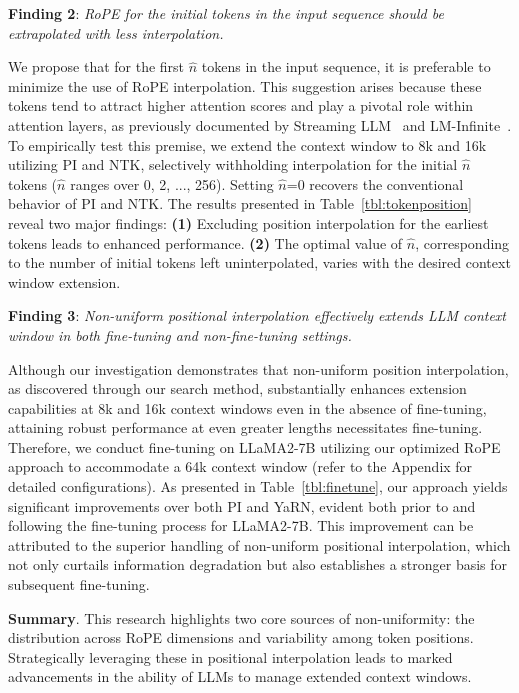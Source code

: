 \textbf{Finding 2}: \textit{RoPE for the initial tokens in the input sequence should be extrapolated with less interpolation.} 

We propose that for the first $\hat{n}$ tokens in the input sequence, it is preferable to minimize the use of RoPE interpolation. This suggestion arises because these tokens tend to attract higher attention scores and play a pivotal role within attention layers, as previously documented by Streaming LLM~\cite{streamingllm} and LM-Infinite~\cite{han2023lminfinite}. To empirically test this premise, we extend the context window to 8k and 16k utilizing PI and NTK, selectively withholding interpolation for the initial $\hat{n}$ tokens ($\hat n$ ranges over 0, 2, ..., 256). Setting $\hat{n}$=0 recovers the conventional behavior of PI and NTK. The results presented in Table~\ref{tbl:tokenposition} reveal two major findings: \textbf{(1)} Excluding position interpolation for the earliest tokens leads to enhanced performance. \textbf{(2)} The optimal value of $\hat{n}$, corresponding to the number of initial tokens left uninterpolated, varies with the desired context window extension.

\textbf{Finding 3}: \textit{Non-uniform positional interpolation effectively extends LLM context window in both fine-tuning and non-fine-tuning settings.} 

Although our investigation demonstrates that non-uniform position interpolation, as discovered through our search method, substantially enhances extension capabilities at 8k and 16k context windows even in the absence of fine-tuning, attaining robust performance at even greater lengths necessitates fine-tuning. Therefore, we conduct fine-tuning on LLaMA2-7B utilizing our optimized RoPE approach to accommodate a 64k context window (refer to the Appendix for detailed configurations). As presented in Table~\ref{tbl:finetune}, our approach yields significant improvements over both PI and YaRN, evident both prior to and following the fine-tuning process for LLaMA2-7B. This improvement can be attributed to the superior handling of non-uniform positional interpolation, which not only curtails information degradation but also establishes a stronger basis for subsequent fine-tuning.

\textbf{Summary}. This research highlights two core sources of non-uniformity: the distribution across RoPE dimensions and variability among token positions. Strategically leveraging these in positional interpolation leads to marked advancements in the ability of LLMs to manage extended context windows.

